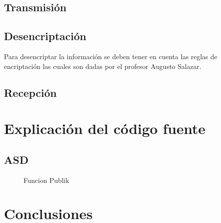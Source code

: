 \documentclass{article}
\begin{document}
\subsection{Transmisión}

\subsection{Desencriptación}
Para desencriptar la información se deben tener en cuenta las reglas de encriptación las cuales son dadas por el profesor Augusto Salazar.

\subsection{Recepción}


\section{Explicación del código fuente} 
 
\label{Elaboracion}
\subsection{ASD}

\begin{figure}
 \centering
 \caption{Funcion Publik}
 \label{f:Publik}
\end{figure}


\section{Conclusiones} 
\label{Algoritmo}



\end{document}
